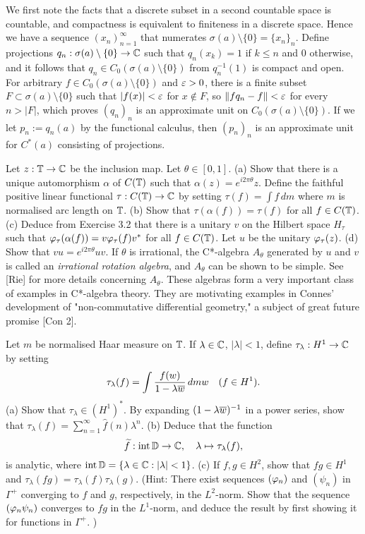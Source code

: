 \documentclass[12pt]{article}
\begin{document}
\begin{sol}
We first note the facts that a discrete subset in a second countable space is countable, and compactness is equivalent to finiteness in a discrete space.
Hence we have a sequence $(x_n)_{n=1}^\infty$ that numerates $\sigma(a)\setminus\{0\}=\{x_n\}_n$.
Define projections $q_n:\sigma(a)\setminus\{0\}\to\mathbb{C}$ such that $q_n(x_k)=1$ if $k\le n$ and 0 otherwise, and it follows that $q_n\in C_0(\sigma(a)\setminus\{0\})$ from $q_n^{-1}(1)$ is compact and open.
For arbitrary $f\in C_0(\sigma(a)\setminus\{0\})$ and $\varepsilon>0$, there is a finite subset $F\subset\sigma(a)\setminus\{0\}$ such that $|f(x)|<\varepsilon$ for $x\notin F$, so $\|fq_n-f\|<\varepsilon$ for every $n>|F|$, which proves $(q_n)_n$ is an approximate unit on $C_0(\sigma(a)\setminus\{0\})$.
If we let $p_n:=q_n(a)$ by the functional calculus, then $(p_n)_n$ is an approximate unit for $C^*(a)$ consisting of projections.
\end{sol}


\begin{prb}
Let $z:\mathbb{T}\to\mathbb{C}$ be the inclusion map.
Let $\theta\in[0,1]$.
(a) Show that there is a unique automorphism $\alpha$ of $C(\mathbb{T})$ such that $\alpha(z)=e^{i2\pi\theta}z$.
Define the faithful positive linear functional $\tau:C(\mathbb{T})\to\mathbb{C}$ by setting $\tau(f)=\int f\,dm$ where $m$ is normalised arc length on $\mathbb{T}$.
(b) Show that $\tau(\alpha(f))=\tau(f)$ for all $f\in C(\mathbb{T})$.
(c) Deduce from Exercise 3.2 that there is a unitary $v$ on the Hilbert space $H_\tau$ such that $\varphi_\tau(\alpha(f))=v\varphi_\tau(f)v^*$ for all $f\in C(\mathbb{T})$.
Let $u$ be the unitary $\varphi_\tau(z)$.
(d) Show that $vu=e^{i2\pi\theta}uv$.
If $\theta$ is irrational, the C*-algebra $A_\theta$ generated by $u$ and $v$ is called an \emph{irrational rotation algebra}, and $A_\theta$ can be shown to be simple.
See [Rie] for more details concerning $A_\theta$.
These algebras form a very important class of examples in C*-algebra theory.
They are motivating examples in Connes' development of "non-commutative differential geometry," a subject of great future promise [Con 2].
\end{prb}
\begin{sol}
\end{sol}


\begin{prb}
Let $m$ be normalised Haar measure on $\mathbb{T}$.
If $\lambda\in\mathbb{C}$, $|\lambda|<1$, define $\tau_\lambda:H^1\to\mathbb{C}$ by setting
\[\tau_\lambda(f)=\int\frac{f(w)}{1-\lambda\overline w}\,dmw\quad(f\in H^1).\]
(a) Show that $\tau_\lambda\in(H^1)^*$.
By expanding $(1-\lambda\overline w)^{-1}$ in a power series, show that $\tau_\lambda(f)=\sum_{n=1}^\infty\hat f(n)\lambda^n$.
(b) Deduce that the function
\[\widetilde f:\operatorname{int}\mathbb{D}\to\mathbb{C},\quad\lambda\mapsto\tau_\lambda(f),\]
is analytic, where $\operatorname{int}\mathbb{D}=\{\lambda\in\mathbb{C}:|\lambda|<1\}$.
(c) If $f,g\in H^2$, show that $fg\in H^1$ and $\tau_\lambda(fg)=\tau_\lambda(f)\tau_\lambda(g)$.
(Hint: There exist sequences $(\varphi_n)$ and $(\psi_n)$ in $\Gamma^+$ converging to $f$ and $g$, respectively, in the $L^2$-norm.
Show that the sequence $(\varphi_n\psi_n)$ converges to $fg$ in the $L^1$-norm, and deduce the result by first showing it for functions in $\Gamma^+$. )
\end{prb}
\begin{sol}
\end{sol}
\end{document}
